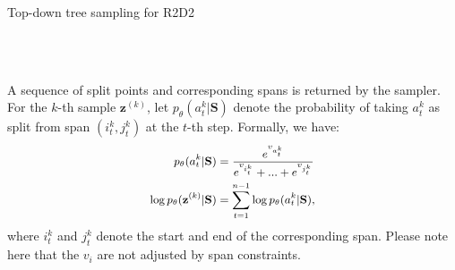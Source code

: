 \begin{algorithm}[!h]
\small
    \caption{Top-down tree sampling for R2D2}
    \label{alg:sample}
    \begin{algorithmic}[1] %
         
         
         
         
         
        \EndFor
         \\
         \\
         
        \EndIf
         
        \EndIf
        \EndWhile
        \EndFunction
    \end{algorithmic}
\end{algorithm}

A sequence of split points and corresponding spans is returned by the sampler. For the $k$-{th} sample $\textbf{z}^{(k)}$, let $p_{\theta}(a_{t}^{k}|\textbf{S})$ denote the probability of taking $a_{t}^{k}$ as split from span $(i_{t}^{k}, j_{t}^{k})$ at the $t$-{th} step. Formally, we have:
\begin{equation}
\small
\begin{aligned}
p_{\theta}(a_{t}^{k}|\textbf{S}) &= \frac{e^{v_{a^{k}_{t}}}}{e^{v_{i^{k}_{t}}} + ... + e^{v_{j^{k}_{t}}}} \\
\log p_{\theta}(\textbf{z}^{(k)}|\textbf{S}) &= \sum_{t=1}^{n-1} \log p_{\theta}(a_{t}^{k}|\textbf{S}),
\end{aligned}
\end{equation}
where $i_{t}^{k}$ and $j_{t}^{k}$ denote the start and end of the corresponding span. Please note here that the $v_i$ are not adjusted by span constraints. 

